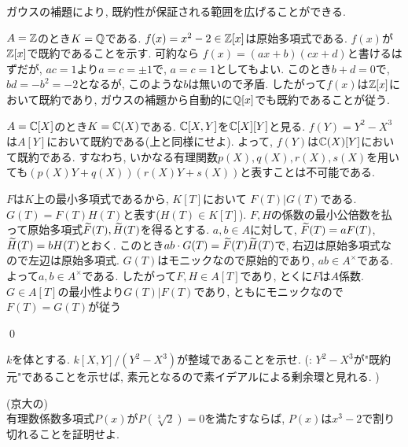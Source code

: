 \begin{eg} ガウスの補題により, 既約性が保証される範囲を広げることができる.
\ben
\item $A=\mathbb{Z}$のとき$K=\mathbb{Q}$である. $f(x) = x^2 - 2\in \mathbb{Z}[x]$は原始多項式である.  $f(x)$が$\mathbb{Z}[x]$で既約であることを示す. 可約なら $f(x) = (ax+b)(cx+d)$と書けるはずだが, $ac = 1$より$a=c=\pm 1$で, $a=c=1$としてもよい. このとき$b+d=0$で, $bd = -b^2 = -2$となるが, このような$b$は無いので矛盾. したがって$f(x)$は$\mathbb{Z}[x]$において既約であり, ガウスの補題から自動的に$\mathbb{Q}[x]$でも既約であることが従う.
\item $A=\mathbb{C}[X]$のとき$K=\mathbb{C}(X)$である. $\mathbb{C}[X,Y]$を$\mathbb{C}[X][Y]$と見る. $f(Y) = Y^2 - X^3$は$A[Y]$において既約である(上と同様にせよ). よって, $f(Y)$は$\mathbb{C}(X)[Y]$において既約である. すなわち, いかなる有理関数$p(X),q(X),r(X),s(X)$を用いても$(p(X)Y+q(X))(r(X)Y + s(X))$と表すことは不可能である.
\een
\end{eg}

\prf $F$は$K$上の最小多項式であるから, $K[T]$において $F(T)|G(T)$である. $G(T) = F(T)H(T)$と表す($H(T) \in K[T]$). $F,H$の係数の最小公倍数を払って原始多項式$\widetilde{F}(T), \widetilde{H}(T)$を得るとする. $a,b\in A$に対して, $\widetilde{F}(T) = aF(T)$, $\widetilde{H}(T) = bH(T)$とおく. このとき$ab\cdot G(T) = \widetilde{F}(T)\widetilde{H}(T)$で, 右辺は原始多項式なので左辺は原始多項式. $G(T)$はモニックなので原始的であり, $ab\in A^{\times}$である. よって$a,b\in A^{\times}$である. したがって$F,H\in A[T]$であり, とくに$F$は$A$係数. $G\in A[T]$の最小性より$G(T) | F(T)$であり, ともにモニックなので $F(T) = G(T)$が従う

\qed





\begin{prac}
$k$を体とする. $k[X,Y]/(Y^2 - X^3)$が整域であることを示せ. (: $Y^2 - X^3$が"既約元"であることを示せば, 素元となるので素イデアルによる剰余環と見れる. )
\end{prac}


\begin{prac} (京大の)\\
有理数係数多項式$P(x)$が$P(\sqrt[3]{2})=0$を満たすならば, $P(x)$は$x^3-2$で割り切れることを証明せよ.
\end{prac}

